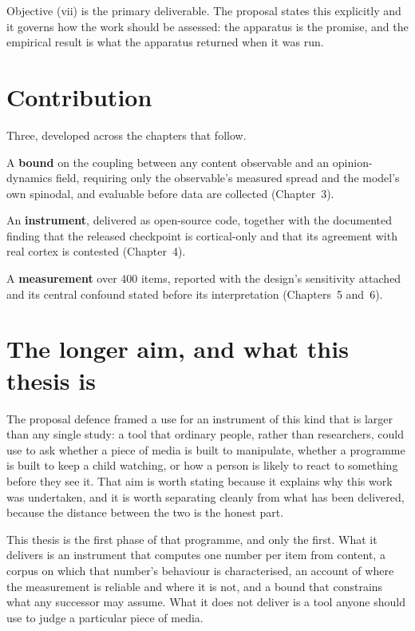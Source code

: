 Objective (vii) is the primary deliverable. The proposal states this explicitly and it governs
how the work should be assessed: the apparatus is the promise, and the empirical result is
what the apparatus returned when it was run.

\section{Contribution}

Three, developed across the chapters that follow.

A \textbf{bound} on the coupling between any content observable and an opinion-dynamics field,
requiring only the observable's measured spread and the model's own spinodal, and evaluable
before data are collected (Chapter~3).

An \textbf{instrument}, delivered as open-source code, together with the documented finding
that the released checkpoint is cortical-only and that its agreement with real cortex is
contested (Chapter~4).

A \textbf{measurement} over 400 items, reported with the design's sensitivity attached and its
central confound stated before its interpretation (Chapters~5 and~6).

\section{The longer aim, and what this thesis is}
\label{sec:phase1}

The proposal defence framed a use for an instrument of this kind that is larger than any
single study: a tool that ordinary people, rather than researchers, could use to ask whether a
piece of media is built to manipulate, whether a programme is built to keep a child watching,
or how a person is likely to react to something before they see it. That aim is worth stating
because it explains why this work was undertaken, and it is worth separating cleanly from
what has been delivered, because the distance between the two is the honest part.

This thesis is the first phase of that programme, and only the first. What it delivers is an
instrument that computes one number per item from content, a corpus on which that number's
behaviour is characterised, an account of where the measurement is reliable and where it is
not, and a bound that constrains what any successor may assume. What it does not deliver is a
tool anyone should use to judge a particular piece of media.

